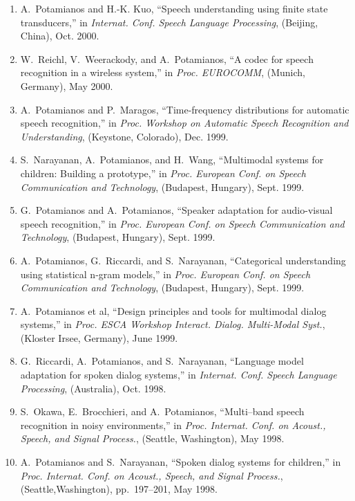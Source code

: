 \begin{enumerate}
\item
A.~Potamianos and H.-K. Kuo, ``Speech understanding using finite state
  transducers,'' in {\em Internat. Conf. Speech Language Processing}, (Beijing,
  China), Oct. 2000.

\item
W.~Reichl, V.~Weerackody, and A.~Potamianos, ``A codec for speech recognition
  in a wireless system,'' in {\em Proc. EUROCOMM}, (Munich, Germany), May 2000.

\item
A.~Potamianos and P.~Maragos, ``Time-frequency distributions for automatic
  speech recognition,'' in {\em Proc. Workshop on Automatic Speech Recognition
  and Understanding}, (Keystone, Colorado), Dec. 1999.

\item
S.~Narayanan, A.~Potamianos, and H.~Wang, ``Multimodal systems for children:
  Building a prototype,'' in {\em Proc. European Conf. on Speech Communication
  and Technology}, (Budapest, Hungary), Sept. 1999.

\item
G.~Potamianos and A.~Potamianos, ``Speaker adaptation for audio-visual speech
  recognition,'' in {\em Proc. European Conf. on Speech Communication and
  Technology}, (Budapest, Hungary), Sept. 1999.

\item
A.~Potamianos, G.~Riccardi, and S.~Narayanan, ``Categorical understanding using
  statistical n-gram models,'' in {\em Proc. European Conf. on Speech
  Communication and Technology}, (Budapest, Hungary), Sept. 1999.

\item
A.~{Potamianos et al}, ``Design principles and tools for multimodal dialog
  systems,'' in {\em Proc. ESCA Workshop Interact. Dialog. Multi-Modal Syst.},
  (Kloster Irsee, Germany), June 1999.

\item
G.~Riccardi, A.~Potamianos, and S.~Narayanan, ``Language model adaptation for
  spoken dialog systems,'' in {\em Internat. Conf. Speech Language Processing},
  (Australia), Oct. 1998.

\item
S.~Okawa, E.~Brocchieri, and A.~Potamianos, ``Multi--band speech recognition in
  noisy environments,'' in {\em Proc. Internat. Conf. on Acoust., Speech, and
  Signal Process.}, (Seattle, Washington), May 1998.

\item
A.~Potamianos and S.~Narayanan, ``Spoken dialog systems for children,'' in {\em
  Proc. Internat. Conf. on Acoust., Speech, and Signal Process.},
  (Seattle,Washington), pp.~197--201, May 1998.


\end{enumerate}
